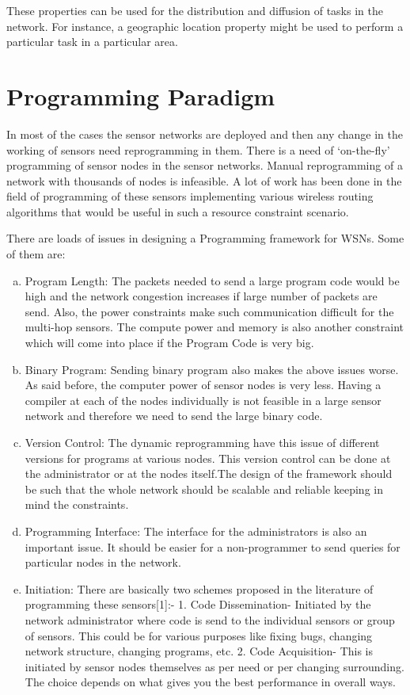 \documentclass[twocolumn]{article}
\begin{document}
These properties can be used for the distribution and diffusion of tasks in the network. For instance, a geographic location property might be used to perform a particular task in a particular area.\\


\section{Programming Paradigm}

In most of the cases the sensor networks are deployed and then any change in the working of sensors need reprogramming in them. There is a need of ‘on-the-fly’ programming of sensor nodes in the sensor networks. Manual reprogramming of a network with thousands of nodes is infeasible. A lot of work has been done in the field of programming of these sensors implementing various wireless routing algorithms that would be useful in such a resource constraint scenario.

There are loads of issues in designing a Programming framework for WSNs. Some of them are:
\begin{enumerate}[a)]
\item Program Length: The packets needed to send a large program code would be high and the network congestion increases if large number of packets are send. Also, the power constraints make such communication difficult for the multi-hop sensors. The compute power and memory is also another constraint which will come into place if the Program Code is very big.

\item Binary Program: Sending binary program also makes the above issues worse. As said before, the computer power of sensor nodes is very less. Having a compiler at each of the nodes individually is not feasible in a large sensor network and therefore we need to send the large binary code.

\item Version Control: The dynamic reprogramming have this issue of different versions for programs at various nodes. This version control can be done at the administrator or at the nodes itself.The design of the framework should be such that the whole network should be scalable and reliable keeping in mind the constraints.

\item Programming Interface: The interface for the administrators is also an important issue. It should be easier for a non-programmer to send queries for particular nodes in the network.

\item Initiation: There are basically two schemes proposed in the literature of programming these sensors[1]:-
1. Code Dissemination- Initiated by the network administrator where code is send to the individual sensors or group of sensors. This could be for various purposes like fixing bugs, changing network structure, changing programs, etc.
2. Code Acquisition- This is initiated by sensor nodes themselves as per need or per changing surrounding.
The choice depends on what gives you the best performance in overall ways.
\end{enumerate}
\end{document}
